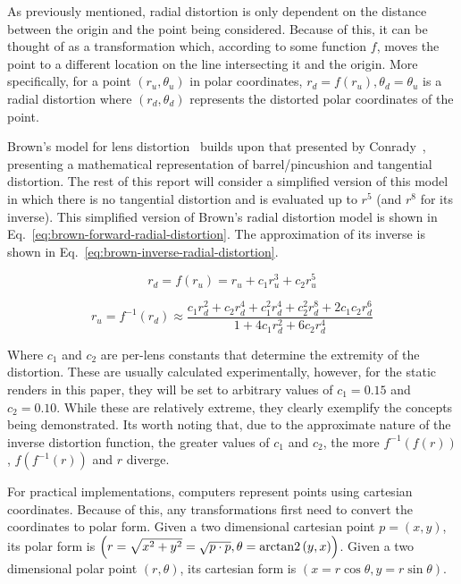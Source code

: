 As previously mentioned, radial distortion is only dependent on the distance between the origin and the point being considered.
Because of this, it can be thought of as a transformation which, according to some function $f$, moves the point to a different location on the line intersecting it and the origin.
More specifically, for a point $(r_u, \theta_u)$ in polar coordinates, $r_d = f(r_u), \theta_d = \theta_u$ is a radial distortion where $(r_d, \theta_d)$ represents the distorted polar coordinates of the point.

Brown's model for lens distortion~\cite{brown1966decentering} builds upon that presented by Conrady~\cite{conrady1919lens}, presenting a mathematical representation of barrel/pincushion and tangential distortion.
The rest of this report will consider a simplified version of this model in which there is no tangential distortion and is evaluated up to $r^5$ (and $r^8$ for its inverse).
This simplified version of Brown's radial distortion model is shown in Eq.~\ref{eq:brown-forward-radial-distortion}.
The approximation of its inverse is shown in Eq.~\ref{eq:brown-inverse-radial-distortion}.

\begin{equation}
    \label{eq:brown-forward-radial-distortion}
    r_d = f(r_u) = r_u + c_1 r_u^3 + c_2 r_u^5
\end{equation}

\begin{equation}
    \label{eq:brown-inverse-radial-distortion}
    r_u = f^{-1}(r_d) \approx \frac{c_1 r_d^2 + c_2 r_d^4 + c_1^2 r_d^4 + c_2^2 r_d^8 + 2 c_1 c_2 r_d^6}{1 + 4 c_1 r_d^2 + 6 c_2 r_d^4}
\end{equation}

Where $c_1$ and $c_2$ are per-lens constants that determine the extremity of the distortion.
These are usually calculated experimentally, however, for the static renders in this paper, they will be set to arbitrary values of $c_1 = 0.15$ and $c_2 = 0.10$.
While these are relatively extreme, they clearly exemplify the concepts being demonstrated.
Its worth noting that, due to the approximate nature of the inverse distortion function, the greater values of $c_1$ and $c_2$, the more $f^{-1}(f(r))$, $f(f^{-1}(r))$ and $r$ diverge.

For practical implementations, computers represent points using cartesian coordinates.
Because of this, any transformations first need to convert the coordinates to polar form.
Given a two dimensional cartesian point $p = (x, y)$, its polar form is $\left(r = \sqrt{x^2 + y^2} = \sqrt{p \cdot p}, \theta = \operatorname{arctan2}{(y, x)}\right)$.
Given a two dimensional polar point $(r, \theta)$, its cartesian form is $\left(x = r \cos{\theta}, y = r \sin{\theta}\right)$.

